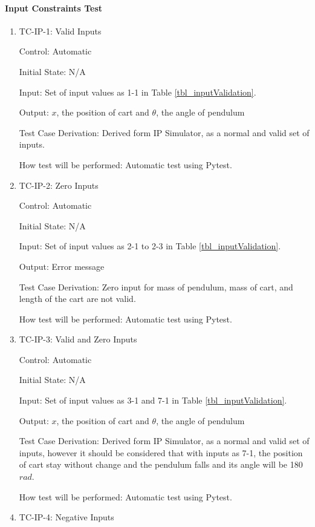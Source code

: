 \documentclass[12pt, titlepage]{article}
\begin{document}
 
\paragraph{Input Constraints Test}

\begin{enumerate}

\item{TC-IP-1: Valid Inputs}

Control: Automatic
					
Initial State: N/A 
					
Input: Set of input values as 1-1 in Table \ref{tbl_inputValidation}.
					
Output: $x$, the position of cart and $\theta$, the angle of pendulum

Test Case Derivation: Derived form IP Simulator, as a normal and valid set of inputs.
					
How test will be performed: Automatic test using Pytest.

\item{TC-IP-2: Zero Inputs}

Control: Automatic
					
Initial State: N/A 
					
Input: Set of input values as 2-1 to 2-3 in Table \ref{tbl_inputValidation}.
					
Output: Error message

Test Case Derivation: Zero input for mass of pendulum, mass of cart, and length of the cart are not valid.
					
How test will be performed: Automatic test using Pytest.

\item{TC-IP-3: Valid and Zero Inputs}

Control: Automatic
					
Initial State: N/A 
					
Input: Set of input values as 3-1  and 7-1 in Table \ref{tbl_inputValidation}.
					
Output: $x$, the position of cart and $\theta$, the angle of pendulum

Test Case Derivation: Derived form IP Simulator, as a normal and valid set of inputs, however it should be considered that with inputs as 7-1, the position of cart stay without change and the pendulum falls and its angle will be 180 $rad$.
					
How test will be performed: Automatic test using Pytest.

\item{TC-IP-4: Negative Inputs}


\end{enumerate}
\end{document}
